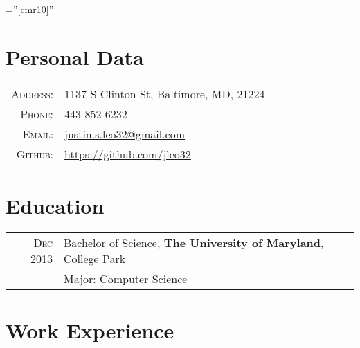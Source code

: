 \documentclass[a4paper,11pt]{article} %
\begin{document}
\pagestyle{empty} %

\font\fb=''[cmr10]'' %


\par{\bigskip\par} %

\section{Personal Data}

\begin{tabular}{rl}
\textsc{Address:} & 1137 S Clinton St, Baltimore, MD, 21224 \\
\textsc{Phone:} & 443 852 6232\\
\textsc{Email:} & \href{mailto:justin.s.leo32@gmail.com}{justin.s.leo32@gmail.com}\\
\textsc{Github:} & \url{https://github.com/jleo32}\\
\end{tabular}


\section{Education}

\begin{tabular}{rl}
\textsc{Dec} 2013 & Bachelor of Science, \textbf{The University of Maryland}, College Park\\
& Major: Computer Science\\

\end{tabular}


\section{Work Experience}
\end{document}
